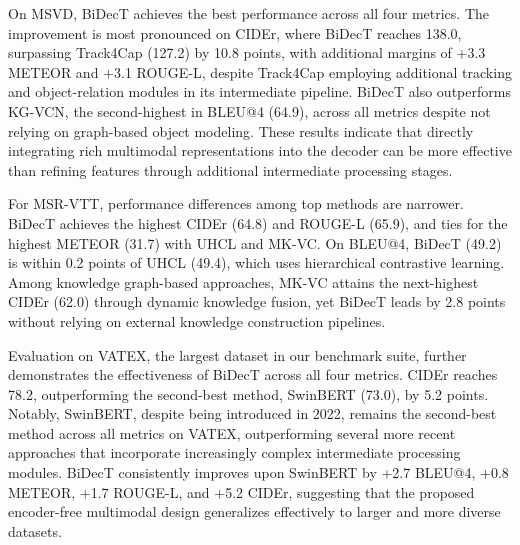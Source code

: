 On MSVD, BiDecT achieves the best performance across all four metrics. The improvement is most pronounced on CIDEr, where BiDecT reaches 138.0, surpassing Track4Cap (127.2) by 10.8 points, with additional margins of +3.3 METEOR and +3.1 ROUGE-L, despite Track4Cap employing additional tracking and object-relation modules in its intermediate pipeline. BiDecT also outperforms KG-VCN, the second-highest in BLEU@4 (64.9), across all metrics despite not relying on graph-based object modeling. These results indicate that directly integrating rich multimodal representations into the decoder can be more effective than refining features through additional intermediate processing stages.

For MSR-VTT, performance differences among top methods are narrower. BiDecT achieves the highest CIDEr (64.8) and ROUGE-L (65.9), and ties for the highest METEOR (31.7) with UHCL and MK-VC. On BLEU@4, BiDecT (49.2) is within 0.2 points of UHCL (49.4), which uses hierarchical contrastive learning. Among knowledge graph-based approaches, MK-VC attains the next-highest CIDEr (62.0) through dynamic knowledge fusion, yet BiDecT leads by 2.8 points without relying on external knowledge construction pipelines.

Evaluation on VATEX, the largest dataset in our benchmark suite, further demonstrates the effectiveness of BiDecT across all four metrics. CIDEr reaches 78.2, outperforming the second-best method, SwinBERT (73.0), by 5.2 points. Notably, SwinBERT, despite being introduced in 2022, remains the second-best method across all metrics on VATEX, outperforming several more recent approaches that incorporate increasingly complex intermediate processing modules. BiDecT consistently improves upon SwinBERT by +2.7 BLEU@4, +0.8 METEOR, +1.7 ROUGE-L, and +5.2 CIDEr, suggesting that the proposed encoder-free multimodal design generalizes effectively to larger and more diverse datasets.

